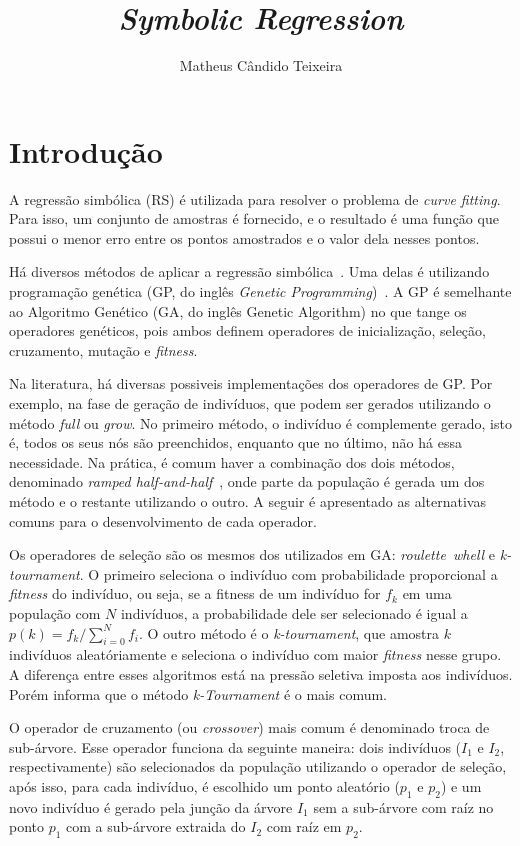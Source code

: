 \documentclass[a4paper]{paper}
\begin{document}
\title{{\itshape Symbolic Regression}}
\author{Matheus Cândido Teixeira}
\maketitle

\section{Introdução}
A regressão simbólica (RS) é utilizada para resolver o problema de \emph{curve
fitting}. Para isso, um conjunto de amostras é fornecido, e o resultado é uma
função que possui o menor erro entre os pontos amostrados e o valor dela nesses
pontos.

Há diversos métodos de aplicar a regressão simbólica~\citep{jin2019}. Uma delas
é utilizando programação genética (GP, do inglês \textit{Genetic
  Programming})~\citep{poli2008}.  A GP é semelhante ao Algoritmo Genético (GA,
do inglês Genetic Algorithm) no que tange os operadores genéticos, pois ambos
definem operadores de inicialização, seleção, cruzamento, mutação e
\textit{fitness}.

Na literatura, há diversas possiveis implementações dos operadores de GP. Por
exemplo, na fase de geração de indivíduos, que podem ser gerados utilizando o
método \textit{full} ou \textit{grow}. No primeiro método, o indivíduo é
complemente gerado, isto é, todos os seus nós são preenchidos, enquanto que no
último, não há essa necessidade. Na prática, é comum haver a combinação dos dois
métodos, denominado \textit{ramped half-and-half}~\citep{poli2008}, onde parte
da população é gerada um dos método e o restante utilizando o outro. A seguir é
apresentado as alternativas comuns para o desenvolvimento de cada operador.

Os operadores de seleção são os mesmos dos utilizados em GA:
\textit{roulette~whell} e \textit{k-tournament}. O primeiro seleciona o
indivíduo com probabilidade proporcional a \textit{fitness} do indivíduo, ou
seja, se a fitness de um indivíduo for \emph{$f_k$} em uma população com $N$
indivíduos, a probabilidade dele ser selecionado é igual a $p(k) =
f_k/\sum_{i=0}^{N}f_i$. O outro método é o \textit{k-tournament}, que amostra
$k$ indivíduos aleatóriamente e seleciona o indivíduo com maior \textit{fitness}
nesse grupo. A diferença entre esses algoritmos está na pressão seletiva imposta
aos indivíduos. Porém \citet{poli2008} informa que o método
\textit{k-Tournament} é o mais comum.

O operador de cruzamento (ou \textit{crossover}) mais comum é denominado troca
de sub-árvore. Esse operador funciona da seguinte maneira: dois indivíduos
($I_1$ e $I_2$, respectivamente) são selecionados da população utilizando o
operador de seleção, após isso, para cada indivíduo, é escolhido um ponto
aleatório ($p_1$ e $p_2$) e um novo indivíduo é gerado pela junção da árvore
$I_1$ sem a sub-árvore com raíz no ponto $p_1$ com a sub-árvore extraida do
$I_2$ com raíz em $p_2$.
\end{document}
